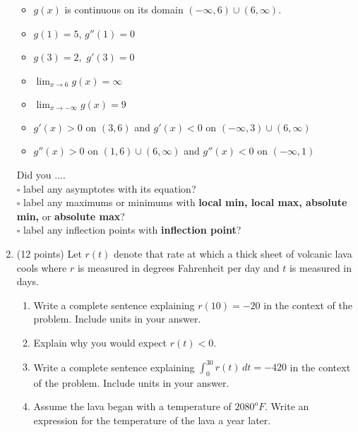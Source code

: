 \documentclass[12pt]{article}
\renewcommand{\emph}[1]{\textsf{\textbf{#1}}}
\begin{document}
\begin{enumerate}
\begin{minipage}{0.7\textwidth}
\end{minipage}
\hspace*{-1in}
\begin{minipage}{0.4\textwidth}
\begin{itemize}
\item $g(x)$ is continuous on its domain $(-\infty,6) \cup (6,\infty).$
\item $g(1)=5$, $g''(1)=0$
\item $g(3)=2,$ $g'(3)=0$
\item $\displaystyle \lim_{x \to 6} g(x)=\infty$
\item $\displaystyle \lim_{x \to -\infty} g(x)=9$
\item $g'(x)>0$ on $(3,6)$ and $g'(x)<0$ on $(-\infty,3)\cup(6,\infty)$
\item $g''(x)>0$ on $(1,6) \cup (6,\infty) $ and $g''(x)<0$ on $(-\infty,1)$
\end{itemize}
\end{minipage}
\vfill
Did you ....\\
$\square$ label any asymptotes with its equation?\\
$\square$ label any maximums or minimums with \emph{local min, local max, absolute min,} or \emph{absolute max}?\\
$\square$ label any inflection points with \emph{inflection point}?\\
\newpage
\item (12 points) Let $r(t)$ denote that rate at which a thick sheet of volcanic lava cools where $r$ is measured in degrees Fahrenheit per day and $t$ is measured in days. 
\begin{enumerate}
\item Write a complete sentence explaining $r(10)=-20$ in the context of the problem. Include units in your answer. 
\vfill
\item Explain why you would expect $r(t) < 0.$
\vfill
\item Write a complete sentence explaining $\int_0^{30} r(t) \, dt = -420$ in the context of the problem. Include units in your answer. 
\vfill
\item Assume the lava began with a temperature of $2080^oF.$ Write an expression for the temperature of the lava a year later.
\vfill
\end{enumerate}


\end{enumerate}
\end{document}
